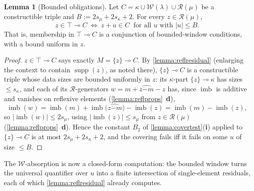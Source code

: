 \documentclass{article}
\theoremstyle{definition}
\newtheorem{lemma}{Lemma}[section]
\newcommand{\cR}{\mathcal{R}}
\newcommand{\cW}{\mathcal{W}}
\newcommand{\supp}{\operatorname{supp}}
\newcommand{\monus}{\mathbin{\dot-}}
\newcommand{\imb}{\operatorname{imb}}
\begin{document}
\begin{lemma}[Bounded obligations]
    \label{lemma:boundedobligation}
    Let $C=\kappa\cup\cW(\lambda)\cup\cR(\mu)$ be a constructible triple and $B:=2s_\mu+2s_\kappa+2$. For every $z\in\cR(\mu)$,
    $$z\in\top\multimap C\ \iff\ z+u\in C\ \text{ for all }u\text{ with }|u|\leq B.$$
    That is, membership in $\top\multimap C$ is a conjunction of bounded-window conditions, with a bound uniform in $z$.
\end{lemma}
\begin{proof}
    $z\in\top\multimap C$ says exactly $M=\{z\}\multimap C$. By \cref{lemma:reflresidual} (enlarging the context to contain $\supp(z)$, as noted there), $\{z\}\multimap C$ is a constructible triple whose data sizes are bounded uniformly in $z$: its $\kappa$-part $\{z\}\multimap\kappa$ has sizes $\leq s_\kappa$, and each of its $\cR$-generators $w=m+\widehat{z\monus m}-z$ has, since $\imb$ is additive and vanishes on reflexive elements (\cref{lemma:reflprops}~{\bf d}),
    $$\imb(w)=\imb(m)+\imb\bigl(\widehat{z\monus m}\bigr)-\imb(z)=\imb(m)-\imb(z),$$
    so $|\imb(w)|\leq 2s_\mu$, using $|\imb(z)|\leq s_\mu$ from $z\in\cR(\mu)$ (\cref{lemma:reflprops}~{\bf d}). Hence the constant $B_2$ of \cref{lemma:covertest}({\bf i}) applied to $\{z\}\multimap C$ is at most $2s_\mu+2s_\kappa+2$, and the covering fails iff it fails on some $u$ of size $\leq B$.
\end{proof}

The $\cW$-absorption is now a closed-form computation: the bounded window turns the universal quantifier over $u$ into a finite intersection of single-element residuals, each of which \cref{lemma:reflresidual} already computes.
\end{document}
